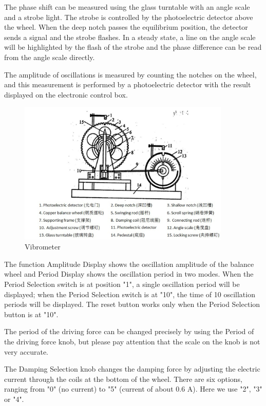 The phase shift can be measured using the glass turntable with an angle scale
and a strobe light. The strobe is controlled by the photoelectric detector above
the wheel. When the deep notch passes the equilibrium position, the detector
sends a signal and the strobe flashes. In a steady state, a line on the angle
scale will be highlighted by the flash of the strobe and the phase difference
can be read from the angle scale directly. 

The amplitude of oscillations is measured by counting the notches on the wheel,
and this measurement is performed by a photoelectric detector with the result
displayed on the electronic control box. 

\begin{figure}[H]
\centering
\includegraphics[width=0.9\textwidth]{fig/es2}
\caption{Vibrometer}\label{vib}
\end{figure}

The function Amplitude Display shows the oscillation amplitude of the balance
wheel and Period Display shows the oscillation period in two modes. When the
Period Selection switch is at position "1", a single oscillation period will be
displayed; when the Period Selection switch is at "10", the time of 10
oscillation periods will be displayed. The reset button works only when the
Period Selection button is at "10".  
    
The period of the driving force can be changed precisely by using the Period of
the driving force knob, but please pay attention that the scale on the knob is
not very accurate. 

The Damping Selection knob changes the damping force by adjusting the electric
current through the coils at the bottom of the wheel. There are six options,
ranging from "0" (no current) to "5" (current of about 0.6 A). Here we use "2",
"3" or "4". 


